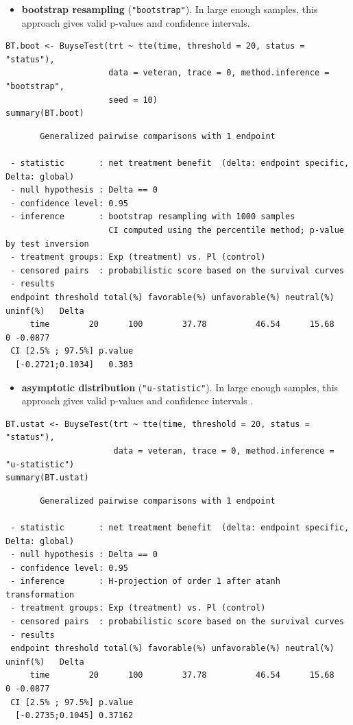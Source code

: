\documentclass[12pt]{article}
\begin{document}
\begin{itemize}
\item \textbf{bootstrap resampling} (\texttt{"bootstrap"}). In large enough samples, this approach gives valid
p-values and confidence intervals.
\end{itemize}

\lstset{language=r,label= ,caption= ,captionpos=b,numbers=none}
\begin{lstlisting}
BT.boot <- BuyseTest(trt ~ tte(time, threshold = 20, status = "status"),
                     data = veteran, trace = 0, method.inference = "bootstrap",
                     seed = 10) 
summary(BT.boot)
\end{lstlisting}

\begin{verbatim}
       Generalized pairwise comparisons with 1 endpoint

 - statistic       : net treatment benefit  (delta: endpoint specific, Delta: global) 
 - null hypothesis : Delta == 0 
 - confidence level: 0.95 
 - inference       : bootstrap resampling with 1000 samples 
                     CI computed using the percentile method; p-value by test inversion 
 - treatment groups: Exp (treatment) vs. Pl (control) 
 - censored pairs  : probabilistic score based on the survival curves
 - results
 endpoint threshold total(%) favorable(%) unfavorable(%) neutral(%) uninf(%)   Delta
     time        20      100        37.78          46.54      15.68        0 -0.0877
 CI [2.5% ; 97.5%] p.value 
  [-0.2721;0.1034]   0.383
\end{verbatim}

\begin{itemize}
\item \textbf{asymptotic distribution} (\texttt{"u-statistic"}). In large enough
samples, this approach gives valid p-values and confidence intervals
\citep{ozenne2021asymptotic}.
\end{itemize}

\lstset{language=r,label= ,caption= ,captionpos=b,numbers=none}
\begin{lstlisting}
BT.ustat <- BuyseTest(trt ~ tte(time, threshold = 20, status = "status"),
                      data = veteran, trace = 0, method.inference = "u-statistic") 
summary(BT.ustat)
\end{lstlisting}

\begin{verbatim}
       Generalized pairwise comparisons with 1 endpoint

 - statistic       : net treatment benefit  (delta: endpoint specific, Delta: global) 
 - null hypothesis : Delta == 0 
 - confidence level: 0.95 
 - inference       : H-projection of order 1 after atanh transformation 
 - treatment groups: Exp (treatment) vs. Pl (control) 
 - censored pairs  : probabilistic score based on the survival curves
 - results
 endpoint threshold total(%) favorable(%) unfavorable(%) neutral(%) uninf(%)   Delta
     time        20      100        37.78          46.54      15.68        0 -0.0877
 CI [2.5% ; 97.5%] p.value 
  [-0.2735;0.1045] 0.37162
\end{verbatim}
\end{document}
